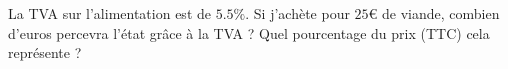 
\begin{exercice}\label{exosmath-0126}

    La TVA sur l'alimentation est de \( 5.5\%\). Si j'achète pour \( 25\)€ de viande, combien d'euros percevra l'état grâce à la TVA ? Quel pourcentage du prix (TTC) cela représente ?

\end{exercice}
